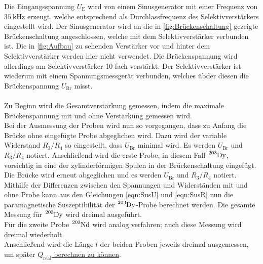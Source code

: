     Die Eingangsspannung $U_\text{E}$ wird von einem Sinusgenerator
    mit einer Frequenz von $\SI{35}{\kilo\hertz}$ erzeugt,
    welche entsprechend als Durchlassfrequenz des Selektivverstärkers eingestellt wird.
    Der Sinusgenerator wird an die in \autoref{fig:Brückenschaltung} gezeigte Brückenschaltung angeschlossen,
    welche mit dem Selektivverstärker verbunden ist.
    Die in \autoref{fig:Aufbau} zu sehenden Verstärker vor und hinter dem Selektivverstärker werden hier nicht verwendet.
    Die Brückenspannung wird allerdings am Selektivverstärker 10-fach verstärkt.
    Der Selektivverstärker ist wiederum mit einem Spannungsmessgerät verbunden,
    welches übder diesen die Brückenspannung $U_\text{Br}$ misst.\\
    \\
    Zu Beginn wird die Gesamtverstärkung gemessen,
    indem die maximale Brückenspannung mit und ohne Verstärkung gemessen wird.\\
    Bei der Ausmessung der Proben wird nun so vorgegangen,
    dass zu Anfang die Brücke ohne eingefügte Probe abgeglichen wird.
    Dazu wird der variable Widerstand $R_3/R_4$ so eingestellt,
    dass $U_\text{Br}$ minimal wird.
    Es werden $U_\text{Br}$ und $R_3/R_4$ notiert.
    Anschließend wird die erste Probe,
    in diesem Fall $\ce{^{203}Dy}$,
    vorsichtig in eine der zylinderförmigen Spulen in der Brückenschaltung eingefügt.
    Die Brücke wird erneut abgeglichen und es werden $U_\text{Br}$ und $R_3/R_4$ notiert.
    Mithilfe der Differenzen zwischen den Spannungen und Widerständen mit und ohne Probe
    kann aus den Gleichungen \eqref{eqn:SusU} und \eqref{eqn:SusR} nun
    die paramagnetische Suszeptibilität der $\ce{^{203}Dy}$-Probe berechnet werden.
    Die gesamte Messung für $\ce{^{203}Dy}$ wird dreimal ausgeführt.\\
    Für die zweite Probe $\ce{^{203}Nd}$ wird analog verfahren;
    auch diese Messung wird dreimal wiederholt.\\
    Anschließend wird die Länge $l$ der beiden Proben jeweils dreimal ausgemessen,
    um später \hyperref[eqn:Q_real]{$Q_\text{real}$ berechnen zu können}.
